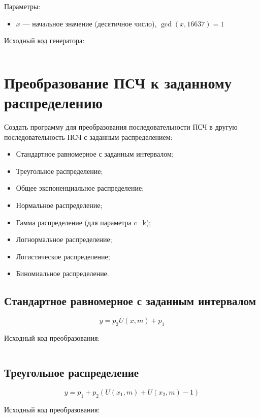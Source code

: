 \documentclass[spec, och, pract_otchet]{SCWorks}
\begin{document}
Параметры:
\begin{itemize}
  \item $x$ --- начальное значение (десятичное число), $\gcd(x, 16637) = 1$
\end{itemize}

Исходный код генератора:
\inputminted{rust}{../prng/src/bbs.rs}


\section{Преобразование ПСЧ к заданному распределению}

Создать программу для преобразования последовательности ПСЧ в другую
последовательность ПСЧ с заданным распределением:
\begin{itemize}
  \item Стандартное равномерное с заданным интервалом;
  \item Треугольное распределение;
  \item Общее экспоненциальное распределение;
  \item Нормальное распределение;
  \item Гамма распределение (для параметра c=k);
  \item Логнормальное распределение;
  \item Логистическое распределение;
  \item Биномиальное распределение.
\end{itemize}


\subsection{Стандартное равномерное с заданным интервалом}

\begin{equation*}
  y = p_2 U(x, m) + p_1
\end{equation*}

Исходный код преобразования:
\inputminted{rust}{../rnc/src/standard.rs}


\subsection{Треугольное распределение}

\begin{equation*}
  y = p_1 + p_2(U(x_1, m) + U(x_2, m) - 1)
\end{equation*}

Исходный код преобразования:
\inputminted{rust}{../rnc/src/triangle.rs}
\end{document}
